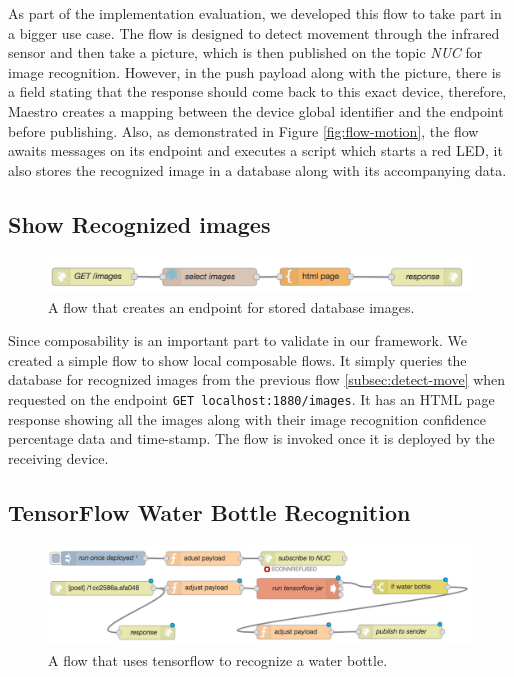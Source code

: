As part of the implementation evaluation, we developed this flow to take part in a bigger use case. The flow is designed to detect movement through the infrared sensor and then take a picture, which is then published on the topic \textit{NUC} for image recognition. However, in the push payload along with the picture, there is a field stating that the response should come back to this exact device, therefore, Maestro creates a mapping between the device global identifier and the endpoint before publishing. Also, as demonstrated in Figure \ref{fig:flow-motion}, the flow awaits messages on its endpoint and executes a script which starts a red LED, it also stores the recognized image in a database along with its accompanying data. 


\subsection{Show Recognized images}\label{subsec:images}

\begin{figure}[H]
	\centering
	\includegraphics[scale=0.6]{images/flow-images.png}
	\caption{A flow that creates an endpoint for stored database images.}
	\label{fig:flow-image}
\end{figure}

Since composability is an important part to validate in our framework. We created a simple flow to show local composable flows. It simply queries the database for recognized images from the previous flow \ref{subsec:detect-move} when requested on the endpoint \verb|GET localhost:1880/images|. It has an HTML page response showing all the images along with their image recognition confidence percentage data and time-stamp. The flow is invoked once it is deployed by the receiving device.


\subsection{TensorFlow Water Bottle Recognition} \label{subsec:tensor}
 \begin{figure}[H]
	\centering
	\includegraphics[scale=0.6]{images/flow-tensor.png}
	\caption{A flow that uses tensorflow to recognize a water bottle.}
	\label{fig:flow-tensor}
\end{figure} 

